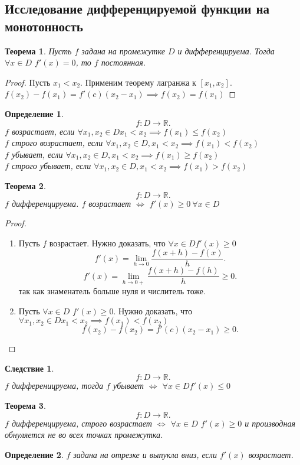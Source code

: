 \documentclass[a4paper]{scrartcl}
\newtheorem{theorem}{Теорема}
\newtheorem{definition}{Определение}
\newtheorem{corollary}{Следствие}[theorem]
\begin{document}
\subsection{Исследование дифференцируемой функции на монотонность}
\begin{theorem}
    Пусть  $f$ задана на промежутке $D$ и дифференцируема. Тогда  $\forall  x \in D$  $f'(x) = 0$, то $f$ постоянная.
\end{theorem}
\begin{proof}
    Пусть $x_1 < x_2$. Применим теорему лагранжа к $[x_1,x_2]$. $f(x_2) - f(x_1) = f'(c)(x_2 - x_1) \implies f(x_2) = f(x_1)$
\end{proof}
\begin{definition}
    \[
    f : D \to \mathbb{R}
    .\] 
    $f$ возрастает, если   $\forall  x_1 , x_2 \in D x_1 < x_2 \implies f(x_1) \le f(x_2)$\\
    $f$ строго возрастает, если  $\forall  x_1,x_2 \in D, x_1 < x_2 \implies f(x_1) < f(x_2)$\\
    $f$ убывает, если  $\forall  x_1, x_2 \in D, x_1 <x_2 \implies f(x_1) \ge  f(x_2)$\\
    $f$ строго убывает, если  $\forall  x_1,x_2 \in D, x_1 < x_2 \implies f(x_1) > f(x_2)$
\end{definition}
\begin{theorem}
    \[
    f:D \to \mathbb{R}
    .\] 
    $f$ дифференцируема.  $f$ возрастает  $\iff$  $f'(x) \ge 0 ~ \forall x \in D$
\end{theorem}
\begin{proof}
    \begin{enumerate}
        \item Пусть $f$ возрастает. Нужно доказать, что  $\forall  x \in D f'(x) \ge  0$
            \[
            f'(x) =  \lim_{h \to 0} \frac{f(x + h) - f(x) }{h}
            .\] 
            \[
            f'(x) = \lim_{h \to 0+} \frac{f(x + h) - f(h)}{h} \ge 0
            .\] 
            так как знаменатель больше нуля и числитель тоже.
        \item
            Пусть $\forall x \in D$ $f'(x) \ge  0$. Нужно доказать, что $\forall  x_1,x_2 \in D x_1 < x_2 \implies f(x_1) < f(x_2)$
            \[
            f(x_2) - f(x_2) = f'(c)(x_2  - x_1) \ge  0 
            .\] 
    \end{enumerate}
\end{proof}
\begin{corollary}
    \[
    f: D \to \mathbb{R}
    .\] 
    $f$ дифференицруема, тогда  $f$ убывает  $\iff$  $\forall  x \in D f'(x) \le  0$
\end{corollary}
\begin{theorem}
    \[
    f: D \to \mathbb{R}
    .\] 
    $f$ дифференцируема, строго возрастает  $\iff$  $\forall  x \in D$ $f'(x) \ge  0$ и производная обнуляется не во всех точках промежутка.
\end{theorem}
\begin{definition}
    $f$ задана на отрезке  и выпукла вниз, если  $f'(x)$ возрастает.
\end{definition}
\end{document}
